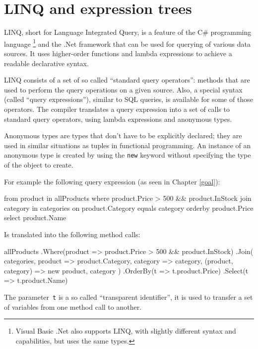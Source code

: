 \section{LINQ and expression trees}

LINQ, short for Language Integrated Query, is a feature of the C\# programming language%
\footnote{Visual Basic .Net also supports LINQ, with slightly different syntax
and capabilities, but uses the same types.}
and the .Net framework that can be used for querying of various data sources.
It uses higher-order functions and lambda expressions to achieve a readable declarative syntax.

LINQ consists of a set of so called “standard query operators”:
methods that are used to perform the query operations on a given source.
Also, a special syntax (called “query expressions”), similar to SQL queries, is available
for some of those operators.
The compiler translates a query expression into a set of calls to standard query operators,
using lambda expressions and anonymous types.

Anonymous types are types that don't have to be explicitly declared;
they are used in similar situations as tuples in functional programming.
An instance of an anonymous type is created by using the \lstinline{new} keyword
without specifying the type of the object to create.

For example the following query expression (as seen in Chapter \ref{goal}):

\nopagebreak

\begin{code}
from product in allProducts
where product.Price > 500
   && product.InStock
join category in categories on product.Category equals category
orderby product.Price
select product.Name
\end{code}

Is translated into the following method calls:

\begin{code}
allProducts
    .Where(product => product.Price > 500 && product.InStock)
    .Join(
        categories,
        product => product.Category,
        category => category,
        (product, category) => new { product, category })
    .OrderBy(t => t.product.Price)
    .Select(t => t.product.Name)
\end{code}

The parameter~\lstinline,t, is a so called “transparent identifier”, it is used to transfer a set of variables from one method call to another.

